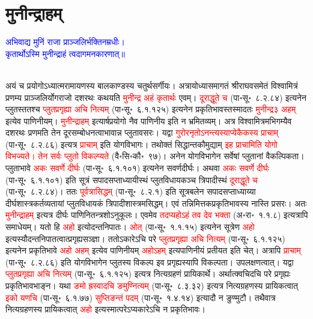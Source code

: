\section[मुनीन्द्राहम्]{मुनीन्द्राहम्‌}
\label{sec:munindraham}
\centering\textcolor{blue}{अभिवाद्य मुनिं राजा प्राञ्जलिर्भक्तिनम्रधीः।\nopagebreak\\
कृतार्थोऽस्मि मुनीन्द्राहं त्वदागमनकारणात्॥}\nopagebreak\\
\\
\begin{sloppypar}\justifying\noindent\hspace{10mm} अयं च प्रयोगोऽध्यात्म\-रामायणस्य बाल\-काण्डस्य चतुर्थ\-सर्गीयः। अत्रायोध्या\-समागतं श्रीराघव\-समेतं विश्वामित्रं प्रणम्य प्राञ्जलिर्योग\-राजो दशरथः कथयति \textcolor{red}{मुनीन्द्र अहं कृतार्थः} एवम्। \textcolor{red}{दूराद्धूते च} (पा॰सू॰~८.२.८४) इत्यनेन प्लुतस्ततश्च \textcolor{red}{प्लुत\-प्रगृह्या अचि नित्यम्‌} (पा॰सू॰~६.१.१२५) इत्यनेन प्रकृति\-भावस्तस्मादतः \textcolor{red}{मुनीन्द्र३ अहम्‌} इत्येव पाणिनीयम्। \textcolor{red}{मुनीन्द्राहम्‌} इत्यार्षप्रयोगो नैव पाणिनीय इति न भ्रमितव्यम्। अत्र विश्वामित्रमभिगम्यैव दशरथः प्रणमति तेन दूर\-सम्बोधनत्वाभावान्न प्लुतावसरः। यद्वा \textcolor{red}{गुरोरनृतोऽ\-नन्त्यस्याप्येकैकस्य प्राचाम्‌} (पा॰सू॰~८.२.८६) इत्यत्र \textcolor{red}{प्राचाम्‌} इति योग\-विभागः। तथोक्तं सिद्धान्त\-कौमुद्याम् \textcolor{red}{इह प्राचामिति योगो विभज्यते। तेन सर्वः प्लुतो विकल्प्यते} (वै॰सि॰कौ॰~९७)। अनेन योग\-विभागेन सर्वेषां प्लुतानां वैकल्पिकता। प्लुताभावे \textcolor{red}{अकः सवर्णे दीर्घः} (पा॰सू॰~६.१.१०१) इत्यनेन सवर्णदीर्घः। अथवा \textcolor{red}{अकः सवर्णे दीर्घः} (पा॰सू॰~६.१.१०१) इति सूत्रं सपाद\-सप्ताध्यायीस्थं प्लुत\-विधायकञ्च त्रिपादीस्थं \textcolor{red}{दूराद्धूते च} (पा॰सू॰~८.२.८४)। ततः \textcolor{red}{पूर्वत्रासिद्धम्‌} (पा॰सू॰~८.२.१) इति सूत्र\-बलेन सपाद\-सप्ताध्याय्या दीर्घ\-शास्त्र\-कर्तव्यतायां प्लुत\-विधायकं त्रिपादी\-शास्त्रमसिद्धम्। एवं तन्निमित्तक\-प्रकृति\-भावस्य नास्ति प्रसरः। अतः \textcolor{red}{मुनीन्द्राहम्‌} इत्यत्र दीर्घः पाणिनि\-तन्त्रशोऽनुकूलः। एवमेव \textcolor{red}{तदप्यहोऽहं तव देव भक्ता} (अ॰रा॰~१.१.८) इत्यत्रापि समाधेयम्। यतो हि \textcolor{red}{अहो} इत्योदन्त\-निपातः। \textcolor{red}{ओत्‌} (पा॰सू॰~१.१.१५) इत्यनेन सूत्रेण \textcolor{red}{अहो} इत्यस्यौदन्त\-निपातत्वात्प्रगृह्य\-सञ्ज्ञा। ततोऽकारेऽचि परे \textcolor{red}{प्लुतप्रगृह्या अचि नित्यम्‌} (पा॰सू॰~६.१.१२५) इत्यनेन प्रकृतिभावे \textcolor{red}{अहो अहम्‌} इत्येव पाणिनीयम् \textcolor{red}{अहोऽहम्‌} इत्यपाणिनीयं प्रतीयत इति चेत्। अत्रापि \textcolor{red}{प्राचाम्‌} (पा॰सू॰~८.२.८६) इति योग\-विभागेन प्लुतस्य विकल्प इव प्रगृह्यस्यापि विकल्पता। उपलक्षणत्वात्। यद्वा \textcolor{red}{प्लुतप्रगृह्या अचि नित्यम्‌} (पा॰सू॰~६.१.१२५) इत्यत्र नित्य\-ग्रहणं प्रायिकार्थे। अर्थात्क्वचिदचि परे प्रगृह्यः प्रकृति\-भाव\-भाङ्न। यथा \textcolor{red}{ङमो ह्रस्वादचि ङमुण्नित्यम्‌} (पा॰सू॰~८.३.३२) इत्यत्र नित्यग्रहणस्य प्रायिकत्वात् \textcolor{red}{इको यणचि} (पा॰सू॰~६.१.७७) \textcolor{red}{सुप्तिङन्तं पदम्‌} (पा॰सू॰~१.४.१४) इत्यादौ न ङुण्मुटौ। तथैवात्र नित्य\-ग्रहणस्य प्रायिकत्वात् \textcolor{red}{अहो} इत्यस्मात्परेऽप्यकारेऽचि न प्रकृतिभावः।\end{sloppypar}
